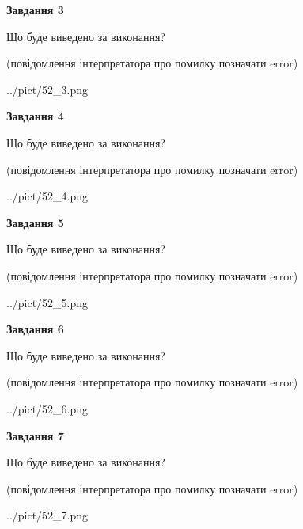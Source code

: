 \documentclass[12pt, ukrainian]{article}
\begin{document}
{\begin {large}
{\begin {center}\textbf{Завдання 3}\end {center}}\par
Що буде виведено за виконання?\par
 (повідомлення інтерпретатора про помилку позначати error)\par
\begin{center}
	{../pict/52_3.png}
\end{center}
\newpage

{\begin {center}\textbf{Завдання 4}\end {center}}\par
Що буде виведено за виконання?\par
 (повідомлення інтерпретатора про помилку позначати error)\par
\begin{center}
	{../pict/52_4.png}
\end{center}
\newpage

{\begin {center}\textbf{Завдання 5}\end {center}}\par
Що буде виведено за виконання?\par
 (повідомлення інтерпретатора про помилку позначати error)\par
\begin{center}
	{../pict/52_5.png}
\end{center}
\newpage

{\begin {center}\textbf{Завдання 6}\end {center}}\par
Що буде виведено за виконання?\par
 (повідомлення інтерпретатора про помилку позначати error)\par
\begin{center}
	{../pict/52_6.png}
\end{center}
\newpage

{\begin {center}\textbf{Завдання 7}\end {center}}\par
Що буде виведено за виконання?\par
 (повідомлення інтерпретатора про помилку позначати error)\par
\begin{center}
	{../pict/52_7.png}
\end{center}
\newpage


\end{large}}
\end{document}
